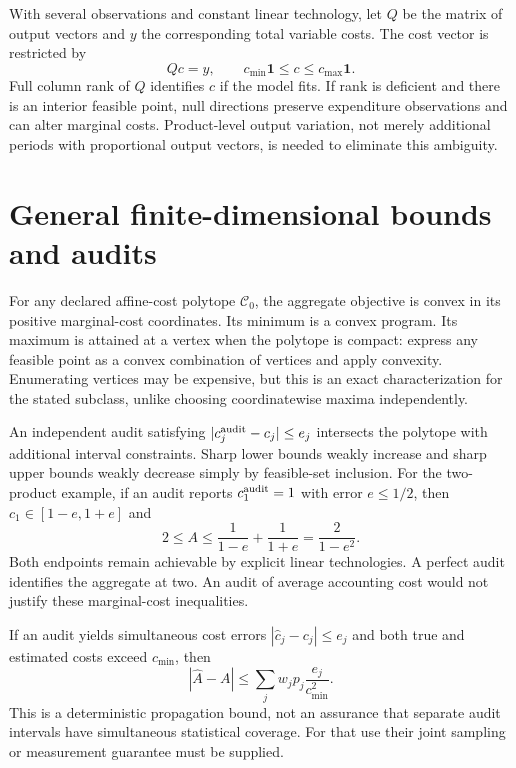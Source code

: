 \documentclass[11pt]{article}
\begin{document}
With several observations and constant linear technology, let $Q$ be the matrix of output vectors and $y$ the corresponding total variable costs. The cost vector is restricted by
\[
 Qc=y,\qquad c_{\min}\mathbf1\leq c\leq c_{\max}\mathbf1.
\]
Full column rank of $Q$ identifies $c$ if the model fits. If rank is deficient and there is an interior feasible point, null directions preserve expenditure observations and can alter marginal costs. Product-level output variation, not merely additional periods with proportional output vectors, is needed to eliminate this ambiguity.

\section*{General finite-dimensional bounds and audits}
For any declared affine-cost polytope $\mathcal C_0$, the aggregate objective is convex in its positive marginal-cost coordinates. Its minimum is a convex program. Its maximum is attained at a vertex when the polytope is compact: express any feasible point as a convex combination of vertices and apply convexity. Enumerating vertices may be expensive, but this is an exact characterization for the stated subclass, unlike choosing coordinatewise maxima independently.

An independent audit satisfying $|c_j^{\rm audit}-c_j|\leq e_j$ intersects the polytope with additional interval constraints. Sharp lower bounds weakly increase and sharp upper bounds weakly decrease simply by feasible-set inclusion. For the two-product example, if an audit reports $c_1^{\rm audit}=1$ with error $e\leq1/2$, then $c_1\in[1-e,1+e]$ and
\[
 2\leq A\leq \frac{1}{1-e}+\frac{1}{1+e}
             =\frac{2}{1-e^2}.
\]
Both endpoints remain achievable by explicit linear technologies. A perfect audit identifies the aggregate at two. An audit of average accounting cost would not justify these marginal-cost inequalities.

If an audit yields simultaneous cost errors $|\widehat c_j-c_j|\leq e_j$ and both true and estimated costs exceed $c_{\min}$, then
\[
 |\widehat A-A|\leq\sum_jw_jp_j\frac{e_j}{c_{\min}^2}.
\]
This is a deterministic propagation bound, not an assurance that separate audit intervals have simultaneous statistical coverage. For that use their joint sampling or measurement guarantee must be supplied.
\end{document}
